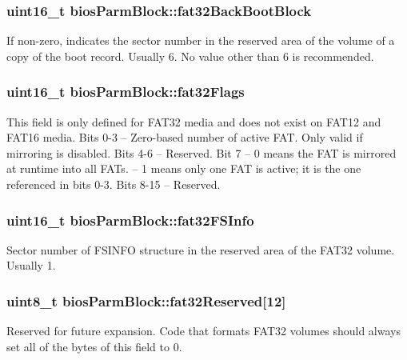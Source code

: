 \subsubsection[{fat32\+Back\+Boot\+Block}]{\setlength{\rightskip}{0pt plus 5cm}uint16\+\_\+t bios\+Parm\+Block\+::fat32\+Back\+Boot\+Block}\label{structbios_parm_block_a7a4e93790b6e66f090c1551020b099bd}
If non-\/zero, indicates the sector number in the reserved area of the volume of a copy of the boot record. Usually 6. No value other than 6 is recommended. \hypertarget{structbios_parm_block_a626ac3dc473d764688b8171916eecf44}{}
\subsubsection[{fat32\+Flags}]{\setlength{\rightskip}{0pt plus 5cm}uint16\+\_\+t bios\+Parm\+Block\+::fat32\+Flags}\label{structbios_parm_block_a626ac3dc473d764688b8171916eecf44}
This field is only defined for F\+A\+T32 media and does not exist on F\+A\+T12 and F\+A\+T16 media. Bits 0-\/3 -- Zero-\/based number of active F\+A\+T. Only valid if mirroring is disabled. Bits 4-\/6 -- Reserved. Bit 7 -- 0 means the F\+A\+T is mirrored at runtime into all F\+A\+Ts. -- 1 means only one F\+A\+T is active; it is the one referenced in bits 0-\/3. Bits 8-\/15 -- Reserved. \hypertarget{structbios_parm_block_a25ea392d8284e6c1d007cb8fcad4b86c}{}
\subsubsection[{fat32\+F\+S\+Info}]{\setlength{\rightskip}{0pt plus 5cm}uint16\+\_\+t bios\+Parm\+Block\+::fat32\+F\+S\+Info}\label{structbios_parm_block_a25ea392d8284e6c1d007cb8fcad4b86c}
Sector number of F\+S\+I\+N\+F\+O structure in the reserved area of the F\+A\+T32 volume. Usually 1. \hypertarget{structbios_parm_block_a351f87fe3446b1a71963a30bbdc23218}{}
\subsubsection[{fat32\+Reserved}]{\setlength{\rightskip}{0pt plus 5cm}uint8\+\_\+t bios\+Parm\+Block\+::fat32\+Reserved\mbox{[}12\mbox{]}}\label{structbios_parm_block_a351f87fe3446b1a71963a30bbdc23218}
Reserved for future expansion. Code that formats F\+A\+T32 volumes should always set all of the bytes of this field to 0. \hypertarget{structbios_parm_block_a77ca01bd99f746e05dd872cbd2979937}{}
